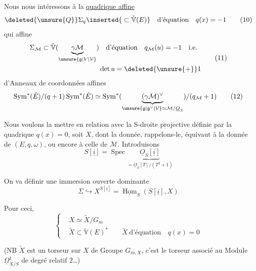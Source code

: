 Nous nous intéressons à la \uline{quadrique affine}
\[
\deleted{\unsure{Q}}\Sigma_q\inserted{{}\subset\check{\mathbb V}(E)}\quad\text{d'équation}\quad q(x)=-1\tag*{(10)}
\]
qui   affine
\[
\begin{aligned}\Sigma_{\mathcal M}\subset\check{\mathbb V}(\underbrace{\gamma\mathcal M}_{\unsure{\mathfrak g|V|\mathcal V}})&\quad\text{d'équation}\quad q_{\mathcal M}(u)=-1\quad\text{i.e.}\\&\det u=\deleted{\unsure{+}}1\end{aligned}\tag*{(11)}
\]
d'Anneaux de coordonnées affines
\[
\operatorname{Sym}^{*}(\check E)/(q+1)\operatorname{Sym}^{*}(\check E)\simeq\operatorname{Sym}^{*}(\underbrace{(\gamma\mathcal M)^\vee}_{\unsure{\mathfrak g|\mathfrak g^\vee|\mathcal V}\simeq\mathcal M/\underline O_S})/(q_{\mathcal M}+1)\tag*{(12)}
\]

Nous voulons la mettre en relation avec la S-droite projective définie par la quadrique $q(x)=0$, soit  $X$,  dont la donnée,
rappelons-le, équivaut à la donnée de $(E,q,\omega)$, ou encore à celle de $\mathcal M$. Introduisons
\[
S[\underline i]=\operatorname{Spec}\underbrace{\underline O_S[\underline i]}_{=\underline O_S[T]/(T^2+1)}\tag*{(13)}
\]

On va définir une immersion ouverte dominante
\[
\Sigma\hookrightarrow X^{S[\underline i]}=\underline{\operatorname{Hom}}_S(S[\underline i],X)\tag*{(14)}
\]

Pour ceci,  
\[
\left\{\begin{aligned}&X\simeq\widetilde X/G_m\\&\widetilde X\subset\check{\mathbb V}(E)^*\qquad\widetilde X\ \text{d'équation}\quad q(x)=0\end{aligned}\right.\tag*{(15)}
\]

(NB $\widetilde X$ est un torseur sur $X$ de Groupe $G_{m,X}$, c'est le torseur associé au Module $\underline\Omega^1_{X/S}$ de degré relatif $2$\ldots)

